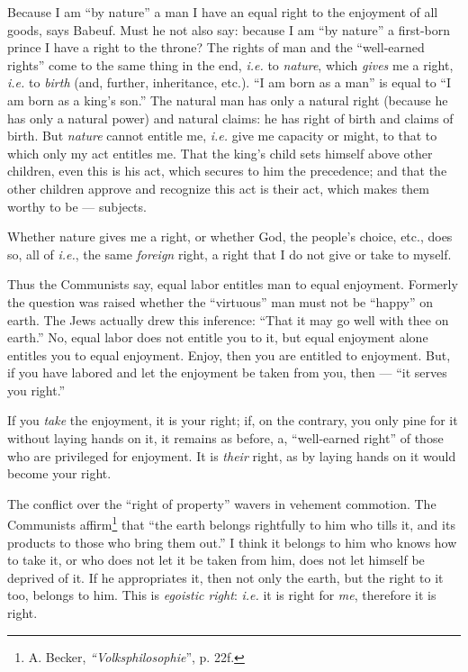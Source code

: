 Because I am ``by nature'' a man I have an equal right to the enjoyment of 
all goods, says Babeuf. Must he not also say: because I am ``by nature'' a 
first-born prince I have a right to the throne? The rights of man and the 
``well-earned rights'' come to the same thing in the end, \textit{i.e.} to 
\textit{nature}, which \textit{gives} me a right, \textit{i.e.} to 
\textit{birth} (and, further, inheritance, etc.). ``I am born as a man'' is 
equal to ``I am born as a king's son.'' The natural man has only a natural 
right (because he has only a natural power) and natural claims: he has right 
of birth and claims of birth. But \textit{nature} cannot entitle me, 
\textit{i.e.} give me capacity or might, to that to which only my act entitles 
me. That the king's child sets himself above other children, even this is his 
act, which secures to him the precedence; and that the other children approve 
and recognize this act is their act, which makes them worthy to be --- subjects.

Whether nature gives me a right, or whether God, the people's choice, etc., 
does so, all of \textit{i.e.}, the same \textit{foreign} right, a right that 
I do not give or take to myself.

Thus the Communists say, equal labor entitles man to equal enjoyment. Formerly 
the question was raised whether the ``virtuous'' man must not be ``happy'' 
on earth. The Jews actually drew this inference: ``That it may go well with 
thee on earth.'' No, equal labor does not entitle you to it, but equal 
enjoyment alone entitles you to equal enjoyment. Enjoy, then you are entitled 
to enjoyment. But, if you have labored and let the enjoyment be taken from 
you, then --- ``it serves you right.''

If you \textit{take} the enjoyment, it is your right; if, on the contrary, you 
only pine for it without laying hands on it, it remains as before, a, 
``well-earned right'' of those who are privileged for enjoyment. It is 
\textit{their} right, as by laying hands on it would become your right.

The conflict over the ``right of property'' wavers in vehement commotion. 
The Communists affirm\footnote{A. Becker, \textit{``Volksphilosophie}'', p. 
22f.} that ``the earth belongs rightfully to him who tills it, and its 
products to those who bring them out.'' I think it belongs to him who knows 
how to take it, or who does not let it be taken from him, does not let himself 
be deprived of it. If he appropriates it, then not only the earth, but the 
right to it too, belongs to him. This is \textit{egoistic right}: 
\textit{i.e.} it is right for \textit{me}, therefore it is right.

